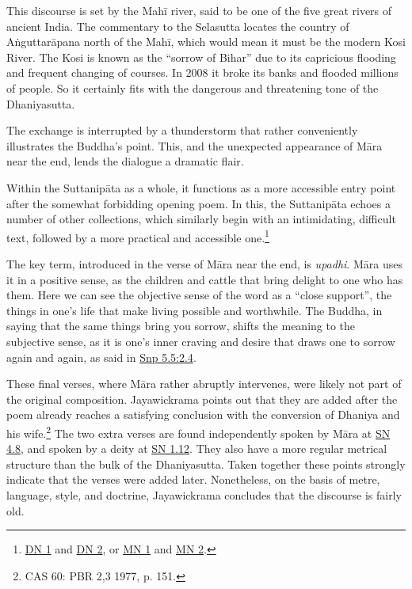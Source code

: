 \documentclass[12pt,openany]{book}%
\begin{document}
This discourse is set by the \textsanskrit{Mahī} river, said to be one of the five great rivers of ancient India. The commentary to the Selasutta locates the country of \textsanskrit{Aṅguttarāpana} north of the \textsanskrit{Mahī}, which would mean it must be the modern Kosi River. The Kosi is known as the “sorrow of Bihar” due to its capricious flooding and frequent changing of courses. In 2008 it broke its banks and flooded millions of people. So it certainly fits with the dangerous and threatening tone of the Dhaniyasutta.

The exchange is interrupted by a thunderstorm that rather conveniently illustrates the Buddha’s point. This, and the unexpected appearance of \textsanskrit{Māra} near the end, lends the dialogue a dramatic flair.

Within the \textsanskrit{Suttanipāta} as a whole, it functions as a more accessible entry point after the somewhat forbidding opening poem. In this, the \textsanskrit{Suttanipāta} echoes a number of other collections, which similarly begin with an intimidating, difficult text, followed by a more practical and accessible one.\footnote{\href{https://suttacentral.net/dn1/en/sujato}{DN 1} and \href{https://suttacentral.net/dn2/en/sujato}{DN 2}, or \href{https://suttacentral.net/mn1/en/sujato}{MN 1} and \href{https://suttacentral.net/mn2/en/sujato}{MN 2}. }

The key term, introduced in the verse of \textsanskrit{Māra} near the end, is \textit{upadhi}. \textsanskrit{Māra} uses it in a positive sense, as the children and cattle that bring delight to one who has them. Here we can see the objective sense of the word as a “close support”, the things in one’s life that make living possible and worthwhile. The Buddha, in saying that the same things bring you sorrow, shifts the meaning to the subjective sense, as it is one’s inner craving and desire that draws one to sorrow again and again, as said in \href{https://suttacentral.net/snp5.5/en/sujato\#2.4}{Snp 5.5:2.4}.

These final verses, where \textsanskrit{Māra} rather abruptly intervenes, were likely not part of the original composition. Jayawickrama points out that they are added after the poem already reaches a satisfying conclusion with the conversion of Dhaniya and his wife.\footnote{CAS 60: PBR 2,3 1977, p. 151. } The two extra verses are found independently spoken by \textsanskrit{Māra} at \href{https://suttacentral.net/sn4.8/en/sujato}{SN 4.8}, and spoken by a deity at \href{https://suttacentral.net/sn1.12/en/sujato}{SN 1.12}. They also have a more regular metrical structure than the bulk of the Dhaniyasutta. Taken together these points strongly indicate that the verses were added later. Nonetheless, on the basis of metre, language, style, and doctrine, Jayawickrama concludes that the discourse is fairly old.
\end{document}
